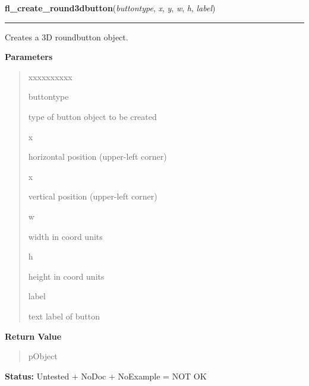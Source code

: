     \label{xformslib:library:fl_create_round3dbutton}

    \vspace{0.5ex}

\hspace{.8\funcindent}\begin{boxedminipage}{\funcwidth}

    \raggedright \textbf{fl\_create\_round3dbutton}(\textit{buttontype}, \textit{x}, \textit{y}, \textit{w}, \textit{h}, \textit{label})

    \vspace{-1.5ex}

    \rule{\textwidth}{0.5\fboxrule}
\setlength{\parskip}{2ex}
    Creates a 3D roundbutton object.

\setlength{\parskip}{1ex}
      \textbf{Parameters}
      \vspace{-1ex}

      \begin{quote}
        \begin{Ventry}{xxxxxxxxxx}

          \item[buttontype]

          type of button object to be created

          \item[x]

          horizontal position (upper-left corner)

          \item[x]

          vertical position (upper-left corner)

          \item[w]

          width in coord units

          \item[h]

          height in coord units

          \item[label]

          text label of button

        \end{Ventry}

      \end{quote}

      \textbf{Return Value}
    \vspace{-1ex}

      \begin{quote}
      pObject

      \end{quote}

\textbf{Status:} Untested + NoDoc + NoExample = NOT OK



    \end{boxedminipage}

